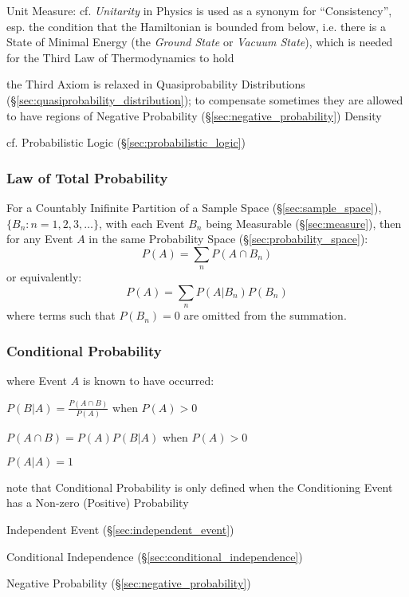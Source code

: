 \fist Unit Measure: cf. \emph{Unitarity} in Physics is used as a synonym for
``Consistency'', esp. the condition that the Hamiltonian is bounded from below,
i.e. there is a State of Minimal Energy (the \emph{Ground State} or
\emph{Vacuum State}), which is needed for the Third Law of Thermodynamics to
hold

the Third Axiom is relaxed in Quasiprobability Distributions
(\S\ref{sec:quasiprobability_distribution}); to compensate sometimes they are
allowed to have regions of Negative Probability
(\S\ref{sec:negative_probability}) Density

\fist cf. Probabilistic Logic (\S\ref{sec:probabilistic_logic})



\subsubsection{Law of Total Probability}\label{sec:total_probability}

For a Countably Inifinite Partition of a Sample Space
(\S\ref{sec:sample_space}), $\{ B_n : n = 1,2,3,\ldots \}$, with each
Event $B_n$ being Measurable (\S\ref{sec:measure}), then for any Event
$A$ in the same Probability Space (\S\ref{sec:probability_space}):
\[
  P(A) = \sum_n P(A \cap B_n)
\]
or equivalently:
\[
  P(A) = \sum_n P(A|B_n) P(B_n)
\]
where terms such that $P(B_n) = 0$ are omitted from the summation.



\subsubsection{Conditional Probability}
\label{sec:conditional_probability}

where Event $A$ is known to have occurred:

$P(B|A) = \frac{P(A \cap B)}{P(A)}$ when $P(A) > 0$

$P(A \cap B) = P(A) P(B|A)$ when $P(A) > 0$

$P(A|A) = 1$

note that Conditional Probability is only defined when the Conditioning Event
has a Non-zero (Positive) Probability

\fist Independent Event (\S\ref{sec:independent_event})

\fist Conditional Independence (\S\ref{sec:conditional_independence})

\fist Negative Probability (\S\ref{sec:negative_probability})


